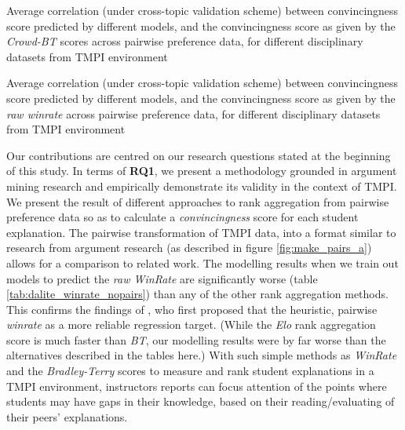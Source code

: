 \documentclass[notitlepage,12pt]{jedm}
\begin{document}
\begin{table}
	\parbox{.45\linewidth}{
		\centering
		
	}
	\hfill
	\parbox{.45\linewidth}{
		\centering
		
	}
	\caption{
		Average correlation (under cross-topic validation scheme) between 
		convincingness score predicted by different models, and the 
		convincingness score as given by the \textit{Crowd-BT} scores across 
		pairwise preference data, for different disciplinary datasets from TMPI 
		environment
	}
	\label{tab:dalite_crowdBT}
\end{table}

\begin{table}
	\parbox{.45\linewidth}{
		\centering
		
	}
	\hfill
	\parbox{.45\linewidth}{
	\centering
		
	}
	\caption{
		Average correlation (under cross-topic validation scheme) between 
		convincingness score predicted by different models, and the 
		convincingness score as given by the \textit{raw winrate} across 
		pairwise preference data, for different disciplinary datasets from TMPI 
		environment
	}
	\label{tab:dalite_winrate_nopairs}
\end{table}

Our contributions are centred on our research questions stated at the beginning 
of this study. 
In terms of \textbf{RQ1}, we present a methodology grounded in argument mining 
research and empirically demonstrate its validity in the context of TMPI.
We present the result of different approaches to rank aggregation from pairwise 
preference data so as to calculate a \textit{convincingness} score for each 
student explanation.
The pairwise transformation of TMPI data, into a format similar to research 
from argument research (as described in figure \ref{fig:make_pairs_a}) allows 
for a comparison to related work. 
The modelling results when we train out models to predict the \textit{raw 
WinRate} are significantly worse (table \ref{tab:dalite_winrate_nopairs}) than 
any of the other rank aggregation methods.
This confirms the findings of \cite{potash_ranking_2019}, who first proposed 
that the heuristic, pairwise \textit{winrate} as a more reliable regression 
target.
(While the \textit{Elo} rank aggregation score is much faster than \textit{BT}, 
our modelling results were by far worse than the alternatives described in the 
tables here.)
With such simple methods as \textit{WinRate} and the \textit{Bradley-Terry} 
scores to measure and rank student explanations in a TMPI environment, 
instructors reports can focus attention of the points where students may have 
gaps in their knowledge, based on their reading/evaluating of their peers' 
explanations.
\end{document}
